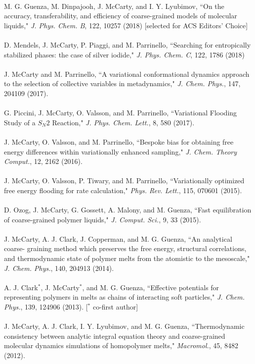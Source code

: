\documentclass[10pt]{article} %
\begin{document}
\\
M. G. Guenza, M. Dinpajooh, J. McCarty, and I. Y. Lyubimov, ``On the accuracy, transferability, and efficiency of coarse-grained models of molecular liquids," {\it J. Phys. Chem. B}, 122, 10257 (2018) [selected for ACS Editors' Choice]  \\
\\
D. Mendels, J. McCarty, P. Piaggi, and M. Parrinello, ``Searching for entropically stabilized phases: the case of silver iodide," {\it J. Phys. Chem. C}, 122, 1786 (2018) \\
\\
J. McCarty and M. Parrinello, ``A variational conformational dynamics approach to the selection of collective variables in metadynamics," {\it J. Chem. Phys.}, 147, 204109 (2017). \\
\\
G. Piccini, J. McCarty, O. Valsson, and M. Parrinello, ``Variational Flooding Study of a $S_N2$ Reaction," {\it J. Phys. Chem. Lett.},  8, 580 (2017).\\
\\
J. McCarty, O. Valsson, and M. Parrinello, ``Bespoke bias for obtaining free energy differences within variationally enhanced sampling," {\it J. Chem. Theory Comput.}, 12, 2162 (2016). \\
\\
J. McCarty, O. Valsson, P. Tiwary, and M. Parrinello, ``Variationally optimized free energy flooding for rate calculation," {\it Phys. Rev. Lett.}, 115, 070601 (2015). \\
\\
D. Ozog, J. McCarty, G. Gossett, A. Malony, and M. Guenza, ``Fast equilibration of coarse-grained polymer liquids," {\it J. Comput. Sci.}, 9, 33 (2015).\\
\\
J. McCarty, A. J. Clark, J. Copperman, and M. G. Guenza, ``An analytical coarse- graining method which preserves the free energy, structural correlations, and thermodynamic state of polymer melts from the atomistic to the mesoscale," {\it J. Chem. Phys.}, 140, 204913 (2014). \\
\\
A. J. Clark$^*$, J. McCarty$^*$, and M. G. Guenza, ``Effective potentials for representing polymers in melts as chains of interacting soft particles," {\it J. Chem. Phys.}, 139, 124906 (2013). [$^*$ co-first author] \\
\\
J. McCarty, A. J. Clark, I. Y. Lyubimov, and M. G. Guenza, ``Thermodynamic consistency between analytic integral equation theory and coarse-grained molecular dynamics simulations of homopolymer melts," {\it Macromol.}, 45, 8482 (2012). \\
\end{document}
